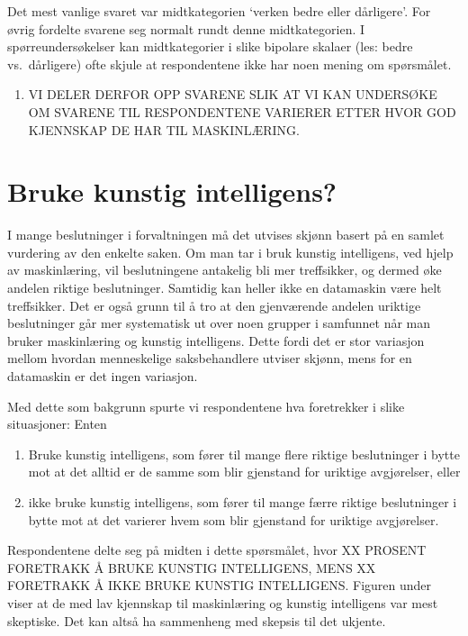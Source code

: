 \documentclass[
]{book}
\providecommand{\tightlist}{%
  \setlength{\itemsep}{0pt}\setlength{\parskip}{0pt}}
\begin{document}
Det mest vanlige svaret var midtkategorien `verken bedre eller dårligere'.
For øvrig fordelte svarene seg normalt rundt denne midtkategorien.
I spørreundersøkelser kan midtkategorier i slike bipolare skalaer (les: bedre vs.~dårligere) ofte skjule at respondentene ikke har noen mening om spørsmålet.

\begin{enumerate}
\def\labelenumi{\arabic{enumi}.}
\tightlist
\item
  VI DELER DERFOR OPP SVARENE SLIK AT VI KAN UNDERSØKE OM SVARENE TIL RESPONDENTENE VARIERER ETTER HVOR GOD KJENNSKAP DE HAR TIL MASKINLÆRING.
\end{enumerate}

\hypertarget{bruke-kunstig-intelligens}{%
\section{Bruke kunstig intelligens?}\label{bruke-kunstig-intelligens}}

I mange beslutninger i forvaltningen må det utvises skjønn basert på en samlet vurdering av den enkelte saken.
Om man tar i bruk kunstig intelligens, ved hjelp av maskinlæring, vil beslutningene antakelig bli mer treffsikker, og dermed øke andelen riktige beslutninger.
Samtidig kan heller ikke en datamaskin være helt treffsikker.
Det er også grunn til å tro at den gjenværende andelen uriktige beslutninger går mer systematisk ut over noen grupper i samfunnet når man bruker maskinlæring og kunstig intelligens.
Dette fordi det er stor variasjon mellom hvordan menneskelige saksbehandlere utviser skjønn, mens for en datamaskin er det ingen variasjon.

Med dette som bakgrunn spurte vi respondentene hva foretrekker i slike situasjoner:
Enten

\begin{enumerate}
\def\labelenumi{\arabic{enumi}.}
\item
  Bruke kunstig intelligens, som fører til mange flere riktige beslutninger i bytte mot at det alltid er de samme som blir gjenstand for uriktige avgjørelser, eller
\item
  ikke bruke kunstig intelligens, som fører til mange færre riktige beslutninger i bytte mot at det varierer hvem som blir gjenstand for uriktige avgjørelser.
\end{enumerate}

Respondentene delte seg på midten i dette spørsmålet, hvor XX PROSENT FORETRAKK Å BRUKE KUNSTIG INTELLIGENS, MENS XX FORETRAKK Å IKKE BRUKE KUNSTIG INTELLIGENS.
Figuren under viser at de med lav kjennskap til maskinlæring og kunstig intelligens var mest skeptiske.
Det kan altså ha sammenheng med skepsis til det ukjente.
\end{document}
